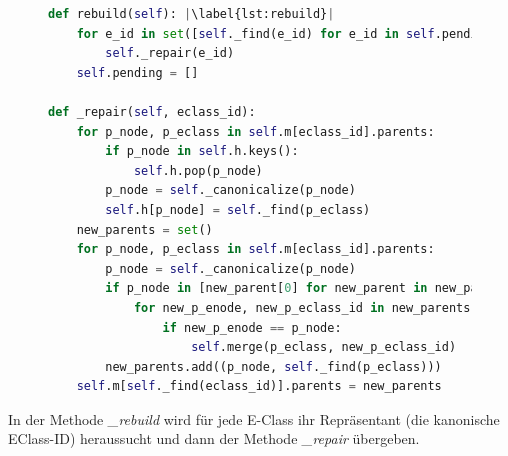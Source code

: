 \begin{figure}
\vspace{-5mm}
\hspace{3mm}
\begin{minipage}[t]{\linewidth}
\begin{lstlisting}[language=Python, escapechar=|, caption=Auszug aus der Klasse \textit{EGraph}, label={lst:methods2}]
def rebuild(self): |\label{lst:rebuild}|
    for e_id in set([self._find(e_id) for e_id in self.pending]):
        self._repair(e_id)
    self.pending = []

def _repair(self, eclass_id):
    for p_node, p_eclass in self.m[eclass_id].parents:
        if p_node in self.h.keys():
            self.h.pop(p_node)
        p_node = self._canonicalize(p_node)
        self.h[p_node] = self._find(p_eclass)
    new_parents = set()
    for p_node, p_eclass in self.m[eclass_id].parents:
        p_node = self._canonicalize(p_node)
        if p_node in [new_parent[0] for new_parent in new_parents]:
            for new_p_enode, new_p_eclass_id in new_parents:
                if new_p_enode == p_node:
                    self.merge(p_eclass, new_p_eclass_id)
        new_parents.add((p_node, self._find(p_eclass)))
    self.m[self._find(eclass_id)].parents = new_parents
\end{lstlisting} 
\end{minipage}
\end{figure}

In der Methode \textit{\_rebuild} wird für jede E-Class ihr Repräsentant (die kanonische EClass-ID) heraussucht und dann der Methode \textit{\_repair} übergeben. 








